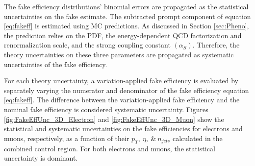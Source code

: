 The fake efficiency distributions' binomial errors are propagated as the statistical uncertainties on the fake estimate. The subtracted prompt component of equation \ref{eq:fakeff} is estimated using MC predictions. As discussed in Section \ref{sec:Pheno}, the prediction relies on the PDF, the energy-dependent QCD factorization and renormalization scale, and the strong coupling constant $(\alpha_{S})$. Therefore, the theory uncertainties on these three parameters are propagated as systematic uncertainties of the fake efficiency. 

For each theory uncertainty, a variation-applied fake efficiency is evaluated by separately varying the numerator and denominator of the fake efficiency equation \ref{eq:fakeff}. The difference between the variation-applied fake efficiency and the nominal fake efficiency is considered systematic uncertainty. Figures \ref{fig:FakeEffUnc_3D_Electron} and \ref{fig:FakeEffUnc_3D_Muon} show the statistical and systematic uncertainties on the fake efficiencies for electrons and muons, respectively, as a function of their $p_{T},~\eta,~\&~n_{jets}$ calculated in the combined control region. For both electrons and muons, the statistical uncertainty is dominant.


